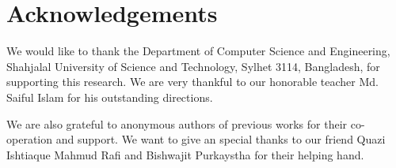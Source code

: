 \documentclass{standalone}
\begin{document}
\chapter*{Acknowledgements}
We would like to thank the Department of Computer Science and Engineering, Shahjalal University of Science and Technology, Sylhet 3114, Bangladesh, for supporting this research. We are very thankful to our honorable teacher Md. Saiful Islam for his outstanding directions.

We are also grateful to anonymous authors of previous works for their co-operation and support.
We want to give an special thanks to our friend Quazi Ishtiaque Mahmud Rafi and Bishwajit Purkaystha for their helping hand.
\end{document}
